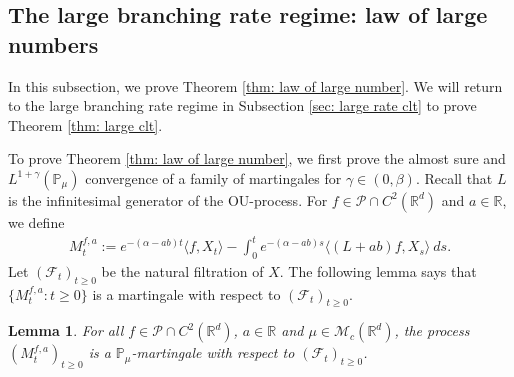 \documentclass[12pt,a4paper]{amsart}
\theoremstyle{plain}
\newtheorem{lem}[thm]{Lemma}
\theoremstyle{definition}
\numberwithin{equation}{section}
\begin{document}
\subsection{The large branching rate regime: law of large numbers}
\label{sec: large rate lln}

    In this subsection, we prove Theorem \ref{thm: law of large number}.
    We will return to the large branching rate regime in Subsection \ref{sec: large rate clt} to prove Theorem \ref{thm: large clt}.

    To prove Theorem \ref{thm: law of large number}, we first prove the almost sure and $L^{1+\gamma}(\mathbb{P}_{\mu})$ convergence of a family of martingales for $\gamma\in (0, \beta)$. Recall that $L$ is the infinitesimal generator of the OU-process.  For $f\in \mathcal{P}\cap C^2(\mathbb R^d)$ and  $a\in \mathbb R$, we define
\begin{align}
\label{defmartingale}
    M_t^{f,a}
    :=e^{-(\alpha-ab)t}\langle f,X_t\rangle-\int_0^t e^{-(\alpha-ab)s}\langle (L+ab)f, X_s\rangle~ ds.
\end{align}
    Let $(\mathscr{F}_t)_{t\geq 0}$ be the natural filtration of $X$.  The following lemma says that $\{M_t^{f,a}: t\geq 0\}$ is a martingale with respect to $(\mathscr{F}_t)_{t\geq 0}$.
\begin{lem}
\label{lemma25}
    For all $f\in \mathcal{P}\cap C^2(\mathbb R^d)$, $a\in \mathbb R$ and $\mu\in \mathcal M_c(\mathbb R^d)$, the process $(M_t^{f,a})_{t\geq 0}$ is a $\mathbb P_\mu$-martingale with respect to $(\mathscr F_t)_{t\geq 0}$.
\end{lem}
\end{document}
